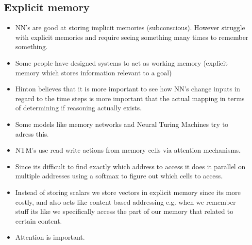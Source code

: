 \documentclass[11pt]{article}
\begin{document}
\subsection{Explicit memory}
\label{sec:org4c4066b}
\begin{itemize}
\item NN's are good at storing implicit memories (subconscious). However struggle with explicit memories and require seeing something many times to remember something.
\item Some people have designed systems to act as working memory (explicit memory which stores information relevant to a goal)
\item Hinton believes that it is more important to see how NN's change inputs in regard to the time steps is more important that the actual mapping in terms of determining if reasoning actually exists.
\item Some models like memory networks and Neural Turing Machines try to adress this.
\item NTM's use read write actions from memory cells via attention mechanisms.
\item Since its difficult to find exactly which address to access it does it parallel on multiple addresses using a softmax to figure out which cells to access.
\item Instead of storing scalars we store vectors in explicit memory since its more costly, and also acts like content based addressing e.g. when we remember stuff its like we specifically access the part of our memory that related to certain content.
\item Attention is important.
\end{itemize}
\end{document}
